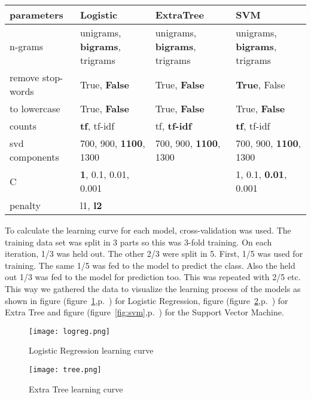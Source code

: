 \documentclass{article}
\begin{document}
\begin{center}
  \begin{tabular} { p{2cm} | p{3cm} | p{3cm} | p{3cm} }
    \hline
    parameters & Logistic & ExtraTree & SVM \\ \hline
    n-grams & unigrams, \textbf{bigrams}, trigrams & unigrams, \textbf{bigrams},
    trigrams & unigrams, \textbf{bigrams}, trigrams \\ \hline
    remove stop-words & True, \textbf{False} & True, \textbf{False} &
    \textbf{True}, False
    \\
    \hline to lowercase & True, \textbf{False} & True, \textbf{False} & True,
    \textbf{False}
    \\
    \hline counts & \textbf{tf}, tf-idf & tf, \textbf{tf-idf} & \textbf{tf},
    tf-idf
    \\
    \hline svd components & 700, 900, \textbf{1100}, 1300 & 700, 900,
    \textbf{1100}, 1300 & 700, 900, \textbf{1100}, 1300 \\ \hline
    C & \textbf{1}, 0.1, 0.01, 0.001 & & 1, 0.1, \textbf{0.01}, 0.001 \\ \hline
    penalty & l1, \textbf{l2} & & \\ \hline
  \end{tabular}
\end{center}

To calculate the learning curve for each model, cross-validation was used. The
training data set was split in 3 parts so this was 3-fold training. On each
iteration, 1/3 was held out. The other 2/3 were split in 5. First, 1/5 was used
for training. The same 1/5 was fed to the model to predict the class. Also the
held out 1/3 was fed to the model for prediction too. This was repeated with 2/5
etc. This way we gathered the data to visualize the learning process of the
models as shown in figure (figure~\ref{fig:logreg},p.~\pageref{fig:logreg}) for
Logistic Regression, figure (figure~\ref{fig:tree},p.~\pageref{fig:tree}) for
Extra Tree and figure (figure~\ref{fig:svm},p.~\pageref{fig:svm}) for the
Support Vector Machine.

  \begin{figure}[H]
  \centering
  \texttt{[image: logreg.png]}
  \caption{Logistic Regression learning curve}
  \label{fig:logreg}
  \end{figure}
  
  \begin{figure}[H]
  \centering
  \texttt{[image: tree.png]}
  \caption{Extra Tree learning curve}
  \label{fig:tree}
  \end{figure}
  
\end{document}
